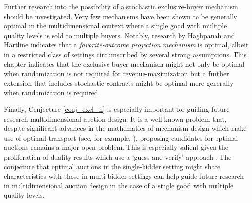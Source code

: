 Further research into the possibility of a stochastic exclusive-buyer mechanism should be investigated. Very few mechanisms have been shown to be generally optimal in the multidimensional context where a single good with multiple quality levels is sold to multiple buyers. Notably, research by Haghpanah and Hartline \autocite*[Theorem 9]{haghpanah2014} indicates that a \textit{favorite-outcome projection mechanism} is optimal, albeit in a restricted class of settings circumscribed by several strong assumptions. This chapter indicates that the exclusive-buyer mechanism might not only be optimal when randomization is not required for revenue-maximization but a further extension that includes stochastic contracts might be optimal more generally when randomization is required.

Finally, Conjecture \ref{conj_excl_n} is especially important for guiding future research multidimensional auction design. It is a well-known problem that, despite significant advances in the mathematics of mechanism design which make use of optimal transport (see, for example, \cite{ekeland2010}), proposing candidates for optimal auctions remains a major open problem. This is especially salient given the proliferation of duality results which use a `guess-and-verify' approach \autocite{daskalakis2017strong,kolesnikov2022}. The conjecture that optimal auctions in the single-bidder setting might share characteristics with those in multi-bidder settings can help guide future research in multidimensional auction design in the case of a single good with multiple quality levels.












